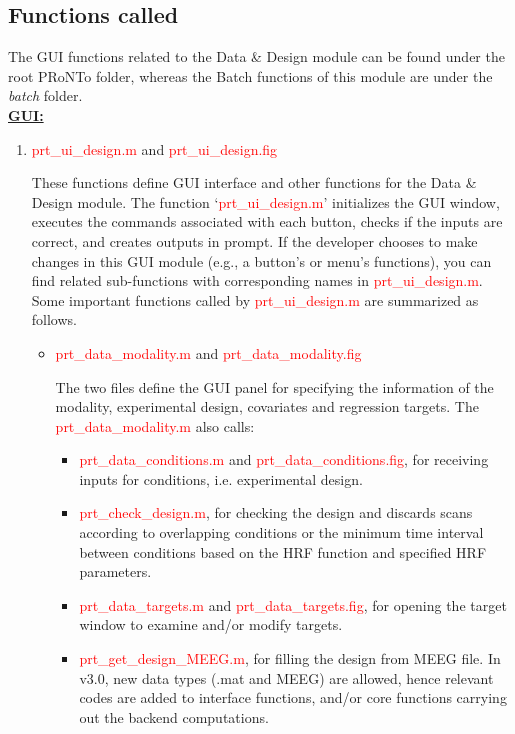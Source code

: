 
\subsection{Functions called}

The GUI functions related to the Data \& Design module can be found under the root PRoNTo folder, whereas the Batch functions of this module are under the \textit{batch} folder.
\\

\noindent
\textbf{\underline{GUI:}}

\begin{enumerate}

\item \textcolor{red}{prt\_ui\_design.m} and \textcolor{red}{prt\_ui\_design.fig}

These functions define GUI interface and other functions for the Data \& Design module. The function `\textcolor{red}{prt\_ui\_design.m}' initializes the GUI window, executes the commands associated with each button, checks if the inputs are correct, and creates outputs in \matlab{} prompt. If the developer chooses to make changes in this GUI module (e.g., a button’s or menu’s functions), you can find related sub-functions with corresponding names in \textcolor{red}{prt\_ui\_design.m}. Some important functions called by \textcolor{red}{prt\_ui\_design.m} are summarized as follows.


\begin{itemize}
\item \textcolor{red}{prt\_data\_modality.m} and \textcolor{red}{prt\_data\_modality.fig}

The two files define the GUI panel for specifying the information of the modality, experimental design, covariates and regression targets. The \textcolor{red}{prt\_data\_modality.m}  also calls:

\begin{itemize}
\item \textcolor{red}{prt\_data\_conditions.m} and \textcolor{red}{prt\_data\_conditions.fig}, for receiving inputs for conditions, i.e. experimental design.
\item \textcolor{red}{prt\_check\_design.m}, for checking the design and discards scans according to overlapping conditions or the minimum time interval between conditions based on the HRF function and specified HRF parameters.
\item \textcolor{red}{prt\_data\_targets.m} and \textcolor{red}{prt\_data\_targets.fig}, for opening the target window to examine and/or modify targets.
\item \textcolor{red}{prt\_get\_design\_MEEG.m}, for filling the design from MEEG file. In v3.0, new data types (.mat and MEEG) are allowed, hence relevant codes are added to interface functions, and/or core functions carrying out the backend computations. 


\end{itemize}
\end{itemize}
\end{enumerate}
